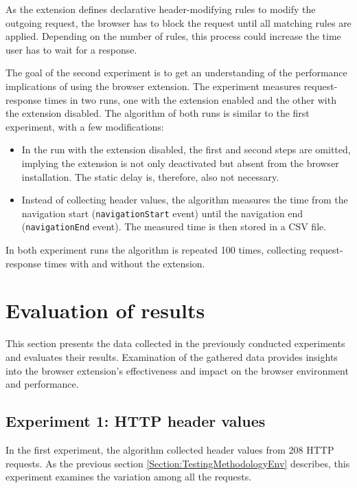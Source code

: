 As the extension defines declarative header-modifying rules to modify the outgoing request, the browser has to block the request until all matching rules are applied. Depending on the number of rules, this process could increase the time user has to wait for a response.

The goal of the second experiment is to get an understanding of the performance implications of using the browser extension. The experiment measures request-response times in two runs, one with the extension enabled and the other with the extension disabled. The algorithm of both runs is similar to the first experiment, with a few modifications:

\begin{itemize}
	\item In the run with the extension disabled, the first and second steps are omitted, implying the extension is not only deactivated but absent from the browser installation. The static delay is, therefore, also not necessary.
	\item Instead of collecting header values, the algorithm measures the time from the navigation start (\texttt{navigationStart} event) until the navigation end (\texttt{navigationEnd} event). The measured time is then stored in a CSV file.
\end{itemize}

In both experiment runs the algorithm is repeated 100 times, collecting request-response times with and without the extension.

\section{Evaluation of results}

This section presents the data collected in the previously conducted experiments and evaluates their results. Examination of the gathered data provides insights into the browser extension's effectiveness and impact on the browser environment and performance.

\subsection{Experiment 1: HTTP header values}

In the first experiment, the algorithm collected header values from 208 HTTP requests. As the previous section \ref{Section:TestingMethodologyEnv} describes, this experiment examines the variation among all the requests.

